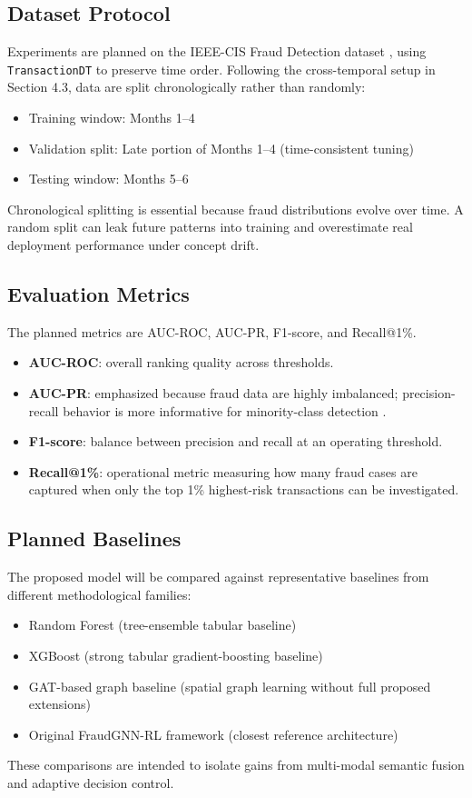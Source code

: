 \documentclass[12pt,a4paper]{report}
\begin{document}
\subsection{Dataset Protocol}
Experiments are planned on the IEEE-CIS Fraud Detection dataset \cite{ieee_cis_dataset}, using \texttt{TransactionDT} to preserve time order. Following the cross-temporal setup in Section 4.3, data are split chronologically rather than randomly:
\begin{itemize}
    \item Training window: Months 1--4
    \item Validation split: Late portion of Months 1--4 (time-consistent tuning)
    \item Testing window: Months 5--6
\end{itemize}
Chronological splitting is essential because fraud distributions evolve over time. A random split can leak future patterns into training and overestimate real deployment performance under concept drift.

\subsection{Evaluation Metrics}
The planned metrics are AUC-ROC, AUC-PR, F1-score, and Recall@1\%.
\begin{itemize}
    \item \textbf{AUC-ROC}: overall ranking quality across thresholds.
    \item \textbf{AUC-PR}: emphasized because fraud data are highly imbalanced; precision-recall behavior is more informative for minority-class detection \cite{saito_pr_imbalanced}.
    \item \textbf{F1-score}: balance between precision and recall at an operating threshold.
    \item \textbf{Recall@1\%}: operational metric measuring how many fraud cases are captured when only the top 1\% highest-risk transactions can be investigated.
\end{itemize}

\subsection{Planned Baselines}
The proposed model will be compared against representative baselines from different methodological families:
\begin{itemize}
    \item Random Forest (tree-ensemble tabular baseline)
    \item XGBoost (strong tabular gradient-boosting baseline)
    \item GAT-based graph baseline (spatial graph learning without full proposed extensions)
    \item Original FraudGNN-RL framework (closest reference architecture)
\end{itemize}
These comparisons are intended to isolate gains from multi-modal semantic fusion and adaptive decision control.
\end{document}
